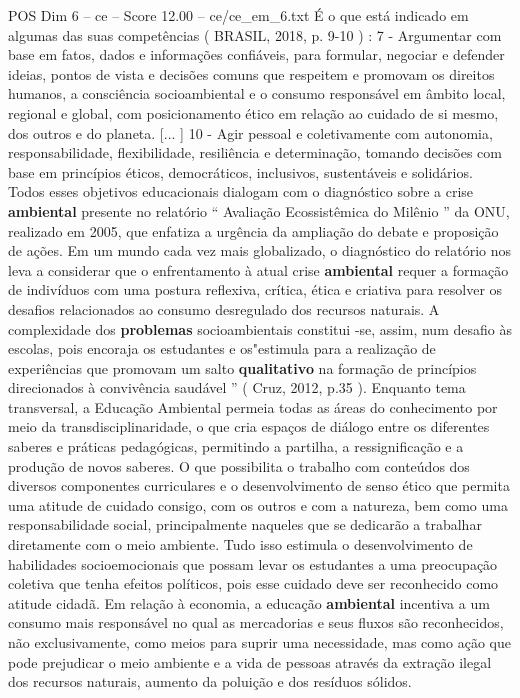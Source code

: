 \begin{textsample}{POS Dim 6 – ce – Score 12.00 – ce/ce\_em\_6.txt}
É o que está indicado em algumas das suas competências ( BRASIL, 2018, p. 9-10 ) : 7 - Argumentar com base em fatos, dados e informações confiáveis, para formular, negociar e defender ideias, pontos de vista e decisões comuns que respeitem e promovam os direitos humanos, a consciência socioambiental e o consumo responsável em âmbito local, regional e global, com posicionamento ético em relação ao cuidado de si mesmo, dos outros e do planeta. [... ] 10 - Agir pessoal e coletivamente com autonomia, responsabilidade, flexibilidade, resiliência e determinação, tomando decisões com base em princípios éticos, democráticos, inclusivos, sustentáveis e solidários.
Todos esses objetivos educacionais dialogam com o diagnóstico sobre a crise \textbf{ambiental} presente no relatório “ Avaliação Ecossistêmica do Milênio ” da ONU, realizado em 2005, que enfatiza a urgência da ampliação do debate e proposição de ações.
Em um mundo cada vez mais globalizado, o diagnóstico do relatório nos leva a considerar que o enfrentamento à atual crise \textbf{ambiental} requer a formação de indivíduos com uma postura reflexiva, crítica, ética e criativa para resolver os desafios relacionados ao consumo desregulado dos recursos naturais.
A complexidade dos \textbf{problemas} socioambientais constitui -se, assim, num desafio às escolas, pois encoraja os estudantes e os"estimula para a realização de experiências que promovam um salto \textbf{qualitativo} na formação de princípios direcionados à convivência saudável ” ( Cruz, 2012, p.35 ).
Enquanto tema transversal, a Educação Ambiental permeia todas as áreas do conhecimento por meio da transdisciplinaridade, o que cria espaços de diálogo entre os diferentes saberes e práticas pedagógicas, permitindo a partilha, a ressignificação e a produção de novos saberes.
O que possibilita o trabalho com conteúdos dos diversos componentes curriculares e o desenvolvimento de senso ético que permita uma atitude de cuidado consigo, com os outros e com a natureza, bem como uma responsabilidade social, principalmente naqueles que se dedicarão a trabalhar diretamente com o meio ambiente.
Tudo isso estimula o desenvolvimento de habilidades socioemocionais que possam levar os estudantes a uma preocupação coletiva que tenha efeitos políticos, pois esse cuidado deve ser reconhecido como atitude cidadã.
Em relação à economia, a educação \textbf{ambiental} incentiva a um consumo mais responsável no qual as mercadorias e seus fluxos são reconhecidos, não exclusivamente, como meios para suprir uma necessidade, mas como ação que pode prejudicar o meio ambiente e a vida de pessoas através da extração ilegal dos recursos naturais, aumento da poluição e dos resíduos sólidos.

\end{textsample}
